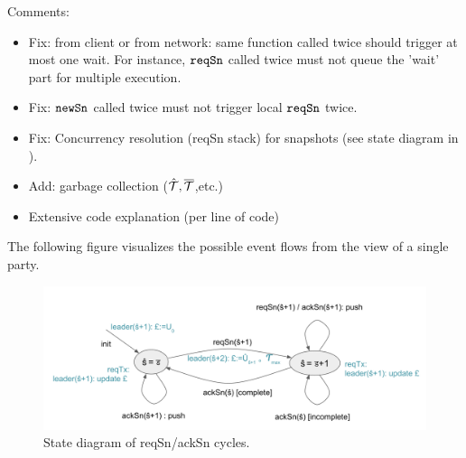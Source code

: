 Comments: 
\begin{itemize}
\item Fix: from client or from network: same function called twice should trigger at most one wait.
  For instance, $\mathtt{reqSn}$ called twice must not queue the 'wait' part for multiple execution.
\item Fix: $\mathtt{newSn}$ called twice must not trigger local $\mathtt{reqSn}$ twice.
\item Fix: Concurrency resolution (reqSn stack) for snapshots (see state diagram in \cite{hydraspec22}).
\item Add: garbage collection ($\hat {\mathcal T},\overline {\mathcal T}$,etc.)
\item Extensive code explanation (per line of code)
\end{itemize}

The following figure visualizes the possible event flows from the view of a single party.
\begin{figure}[ht]
  \centering
  \includegraphics[width=\linewidth*2/3]{fig/reqackstates.png}
                  \caption{State diagram of reqSn/ackSn cycles.}
                  \label{fig:sim:baselines}
\end{figure}


